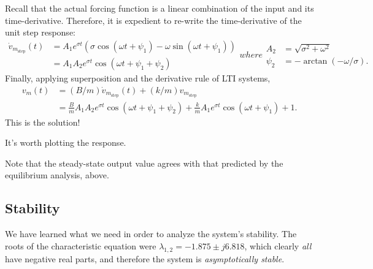 \documentclass[dynamic_systems.tex]{subfiles}
\begin{document}
Recall that the actual forcing function is a linear combination of the input and its time-derivative.
Therefore, it is expedient to re-write the time-derivative of the unit step response:
\tags{}
\begin{subequations}
\begin{align}
	\dot{v}_{m_\text{step}}(t) &= A_1 e^{\sigma t} 
	\left(
		\sigma \cos(\omega t + \psi_1) -
		\omega \sin(\omega t + \psi_1)
	\right) \\
	&= A_1 A_2 e^{\sigma t}\cos(\omega t + \psi_1 + \psi_2)
\end{align}
where
\begin{align}
	A_2 &= \sqrt{\sigma^2 + \omega^2} \\
	\psi_2 &= -\arctan(-\omega/\sigma).
\end{align}
\end{subequations}
Finally, applying superposition and the derivative rule of LTI systems,
\begin{subequations}
	\begin{align}
		v_m(t) &= (B/m) \dot{v}_{m_\text{step}}(t) + (k/m) v_{m_\text{step}} \\
		&= 
		\frac{B}{m} A_1 A_2 
		e^{\sigma t}\cos(\omega t + \psi_1 + \psi_2) 
		+
		\frac{k}{m} A_1 e^{\sigma t} \cos(\omega t + \psi_1)
		+
		1.
	\end{align}
\end{subequations}
This is the solution!

It's worth plotting the response.


Note that the steady-state output value agrees with that predicted by the equilibrium analysis, above.
\tags{}

\subsection{Stability}
\tags{}

We have learned what we need in order to analyze the system's stability.
The roots of the characteristic equation were $\lambda_{1,2} = -1.875 \pm j 6.818$, which clearly \emph{all} have negative real parts, and therefore the system is \emph{asymptotically stable}.
\tags{}
\end{document}
